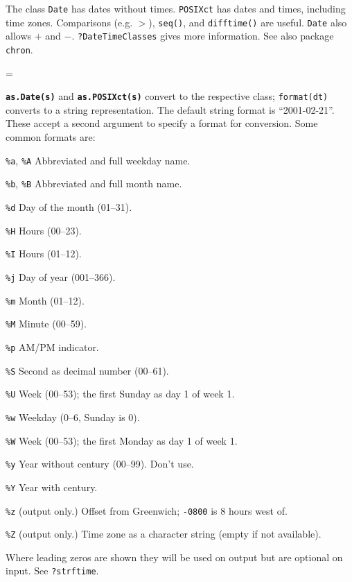 \documentclass[10pt,landscape]{article}
\newcommand{\code}{\texttt}
\newcommand{\bcode}[1]{\texttt{\textbf{#1}}}
\newcommand{\describe}[1]{\begin{description}{#1}\end{description}}
\begin{document}
\begin{multicols*}{3}
The class \code{Date} has dates without times.  \code{POSIXct} has
dates and times, including time zones. Comparisons (e.g. $>$),
\code{seq()}, and \code{difftime()} are useful. \code{Date} also allows
$+$ and $-$. \code{?DateTimeClasses} gives more information. See also package
\code{chron}.

\everypar={\hangindent=9mm}

\bcode{as.Date(s)} and \bcode{as.POSIXct(s)} convert to the respective
class; \code{format(dt)} converts to a string representation. The
default string format is ``2001-02-21''. These accept a second argument
to specify a format for conversion. Some common formats are:

  \describe{
\itemsep=0pt\parskip=0pt
    \item{\code{\%a}, \code{\%A}} {Abbreviated and full weekday name.}
    \item{\code{\%b}, \code{\%B}} {Abbreviated and full month name.}
    \item{\code{\%d}} {Day of the month (01--31).}
    \item{\code{\%H}} {Hours (00--23).}
    \item{\code{\%I}} {Hours (01--12).}
    \item{\code{\%j}} {Day of year (001--366).}
    \item{\code{\%m}} {Month (01--12).}
    \item{\code{\%M}} {Minute (00--59).}
    \item{\code{\%p}} {AM/PM indicator. }
    \item{\code{\%S}} {Second as decimal number (00--61).}
    \item{\code{\%U}} {Week (00--53); the first Sunday as day 1 of week 1.}
    \item{\code{\%w}} {Weekday (0--6, Sunday is 0).}
    \item{\code{\%W}} {Week (00--53); the first Monday as day 1 of week 1.}
    \item{\code{\%y}} {Year without century (00--99). Don't use.}
    \item{\code{\%Y}} {Year with century.}
    \item{\code{\%z}} {(output only.) Offset from Greenwich; \code{-0800} is 8 hours west of.}
    \item{\code{\%Z}} {(output only.) Time zone as a character
      string (empty if not available).}
  }

Where leading zeros are shown they will be used on output but are
optional on input. See \code{?strftime}.  






\end{multicols*}
\end{document}
